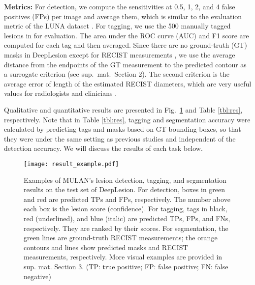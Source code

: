 \documentclass[runningheads]{llncs}
\def\Fig#1{{Fig.\ \ref{fig:#1}}}
\begin{document}
\textbf{Metrics:} For detection, we compute the sensitivities at 0.5, 1, 2, and 4 false positives (FPs) per image \cite{Yan20183DCE} and average them, which is similar to the evaluation metric of the LUNA dataset \cite{Liao2019leaky}. For tagging, we use the 500 manually tagged lesions in \cite{Yan2019Lesa} for evaluation. The area under the ROC curve (AUC) and F1 score are computed for each tag and then averaged. Since there are no ground-truth (GT) masks in DeepLesion except for RECIST measurements \cite{Tang2018RECIST}, we use the average distance from the endpoints of the GT measurement to the predicted contour as a surrogate criterion (see sup.\ mat.\ Section 2). The second criterion is the average error of length of the estimated RECIST diameters, which are very useful values for radiologists and clinicians \cite{Eisenhauer2009RECIST}.

Qualitative and quantitative results are presented in \Fig{result_example} and Table \ref{tbl:res}, respectively. Note that in Table \ref{tbl:res}, tagging and segmentation accuracy were calculated by predicting tags and masks based on GT bounding-boxes, so that they were under the same setting as previous studies \cite{Tang2018RECIST,Yan2019Lesa} and independent of the detection accuracy. We will discuss the results of each task below.

\begin{figure}[]
	\begin{center}
\texttt{[image: result\_example.pdf]} \end{center}
	\caption{Examples of MULAN's lesion detection, tagging, and segmentation results on the test set of DeepLesion. For detection, boxes in green and red are predicted TPs and FPs, respectively. The number above each box is the lesion score (confidence). For tagging, tags in black, red (underlined), and blue (italic) are predicted TPs, FPs, and FNs, respectively. They are ranked by their scores. For segmentation, the green lines are ground-truth RECIST measurements; the orange contours and lines show predicted masks and RECIST measurements, respectively. More visual examples are provided in sup. mat. Section 3. (TP: true positive; FP: false positive; FN: false negative)}
	\label{fig:result_example}
\end{figure}
\end{document}
